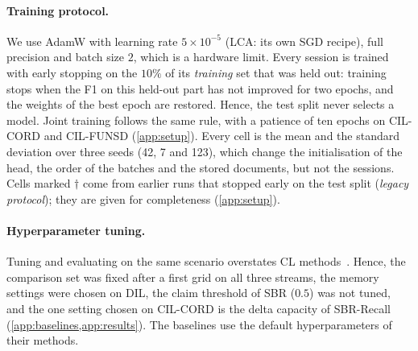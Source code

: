 \documentclass[10pt,twocolumn,letterpaper]{article}
\begin{document}
\paragraph{Training protocol.}\label{sec:protocol} We use AdamW with learning rate $5{\times}10^{-5}$ (LCA: its own SGD recipe), full precision and batch size $2$, which is a hardware limit. Every session is trained with early stopping on the $10\%$ of its \emph{training} set that was held out: training stops when the F1 on this held-out part has not improved for two epochs, and the weights of the best epoch are restored. Hence, the test split never selects a model. Joint training follows the same rule, with a patience of ten epochs on CIL-CORD and CIL-FUNSD (\cref{app:setup}). Every cell is the mean and the standard deviation over three seeds (42, 7 and 123), which change the initialisation of the head, the order of the batches and the stored documents, but not the sessions. Cells marked $\dagger$ come from earlier runs that stopped early on the test split (\emph{legacy protocol}); they are given for completeness (\cref{app:setup}).

\paragraph{Hyperparameter tuning.} Tuning and evaluating on the same scenario overstates CL methods~\citep{cha2025hyperparameters}. Hence, the comparison set was fixed after a first grid on all three streams, the memory settings were chosen on DIL, the claim threshold of SBR ($0.5$) was not tuned, and the one setting chosen on CIL-CORD is the delta capacity of SBR-Recall (\cref{app:baselines,app:results}). The baselines use the default hyperparameters of their methods.

\begin{table}[t]
\centering\small
\setlength{\tabcolsep}{4pt}
\caption{\textbf{Comparison with continual-learning baselines} on LayoutLMv3 over six streams. F1: full-label F1; AA and AF: average accuracy and forgetting (\cref{sec:setup}). AA and F1: mean $\pm$ s.d. over three seeds, per-seed values when fewer; AF: mean; ``--'': not run. Bold: best of each column, Joint training aside; underlined: our best when a baseline is best. $^\dagger$legacy protocol; $^{n=k}$: $k$ clean seeds so far; $^{b}$with the $50$-document memory; on CIL-WildReceipt and DIL-XFUND, ER keeps $200$ documents and DER++ $250$; on CIL-FUNSD both keep $20$, the memory of the CoLaR cells there; Ports and protocols: \cref{app:baselines}; what each method stores: \cref{tab:memcmp}.}
\label{tab:main}
\resizebox{\linewidth}{!}{}
\end{table}
\end{document}
